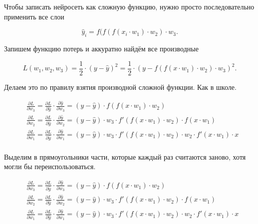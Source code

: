 \begin{sol} Чтобы записать нейросеть как сложную функцию, нужно просто последовательно применить все слои

\[
\hat y_i = f(f(f(x_i \cdot w_1) \cdot w_2) \cdot w_3.
\]

Запишем функцию потерь и аккуратно найдём все производные

\[
L(w_1, w_2, w_3) = \frac{1}{2} \cdot (y - \hat y)^2 = \frac{1}{2} \cdot (y - f(f(x \cdot w_1) \cdot w_2) \cdot w_3)^2.
\]

Делаем это по правилу взятия производной сложной функции. Как в школе. 

\begin{equation*}
    \begin{aligned} 
        & \frac{\partial L}{\partial w_3} =  \frac{\partial L}{\partial \hat y} \cdot \frac{\partial \hat y}{\partial w_3} =  (y - \hat{y})  \cdot f(f(x\cdot w_1) \cdot w_2) \\
        & \frac{\partial L}{\partial w_2} =  \frac{\partial L}{\partial \hat y} \cdot \frac{\partial \hat y}{\partial w_2} =  (y - \hat{y}) \cdot  w_3 \cdot f'(f(x\cdot w_1) \cdot w_2) \cdot f(x\cdot w_1) \\
        & \frac{\partial L}{\partial w_1} = \frac{\partial L}{\partial \hat y} \cdot \frac{\partial \hat y}{\partial w_1} =  (y - \hat{y})  \cdot  w_3 \cdot f'(f(x\cdot w_1) \cdot w_2) \cdot w_2 \cdot  f'(x\cdot w_1) \cdot x \\
    \end{aligned} 
\end{equation*}

Выделим в прямоугольники части, которые каждый раз считаются заново, хотя могли бы переиспользоваться. 

\begin{equation*}
    \begin{aligned} 
    & \frac{\partial L}{\partial w_3} =  \frac{\partial L}{\partial \hat y} \cdot \frac{\partial \hat y}{\partial w_3} = \boxed{ (y - \hat{y}) } \cdot f(f(x\cdot w_1) \cdot w_2) \\
    & \frac{\partial L}{\partial w_2} =  \frac{\partial L}{\partial \hat y} \cdot \frac{\partial \hat y}{\partial w_2} = \boxed{ (y - \hat{y})} \cdot \boxed{ w_3 \cdot f'(f(x\cdot w_1) \cdot w_2)} \cdot f(x\cdot w_1) \\
    & \frac{\partial L}{\partial w_1} = \frac{\partial L}{\partial \hat y} \cdot \frac{\partial \hat y}{\partial w_1} = \boxed{ (y - \hat{y}) } \cdot \boxed{ w_3 \cdot f'(f(x\cdot w_1) \cdot w_2)} \cdot w_2 \cdot  f'(x\cdot w_1) \cdot x \\
    \end{aligned} 
\end{equation*}


\end{sol}
